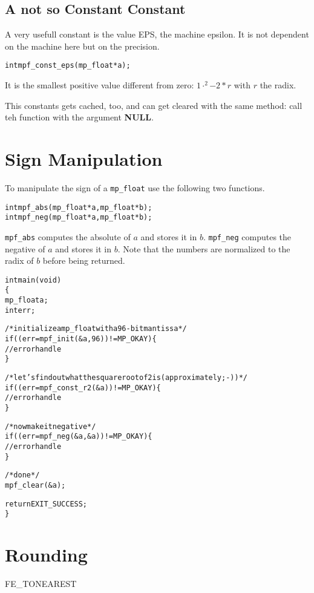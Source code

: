\documentclass[a4paper]{book}
\theoremstyle{definition}
\theoremstyle{remark}
\begin{document}
\subsection{A not so Constant Constant}
A very usefull constant is the value EPS, the machine epsilon. It is not dependent on the machine here but on the precision.
\begin{alltt}
int  mpf_const_eps(mp_float * a);
\end{alltt}
It is the smallest positive value different from zero: $1\cdot^2{-2*r}$ with $r$ the radix.

This constants gets cached, too, and can get cleared with the same method: call teh function with the argument {\textbf{NULL}}.

\section{Sign Manipulation}
To manipulate the sign of a {\texttt{mp\_float}} use the following two functions.

 
\begin{alltt}
int  mpf_abs(mp_float *a, mp_float *b);
int  mpf_neg(mp_float *a, mp_float *b);
\end{alltt}

{\texttt{mpf\_abs}} computes the absolute of $a$ and stores it in $b$.  {\texttt{mpf\_neg}} computes the negative of $a$ and stores it in $b$.  Note that the numbers are normalized to the radix of $b$ before being returned.  

\begin{alltt}
int main(void)
\{
   mp_float a;
   int err;

   /* initialize a mp_float with a 96-bit mantissa */
   if ((err = mpf_init(&a, 96)) != MP_OKAY) \{
      // error handle
   \}

   /* let's find out what the square root of 2 is (approximately ;-)) */
   if ((err = mpf_const_r2(&a)) != MP_OKAY) \{
      // error handle 
   \}

   /* now make it negative */
   if ((err = mpf_neg(&a, &a)) != MP_OKAY) \{
      // error handle 
   \}
   
   /* done */
   mpf_clear(&a);

   return EXIT_SUCCESS;
\}
\end{alltt}

\section{Rounding}
FE_TONEAREST
\end{document}
